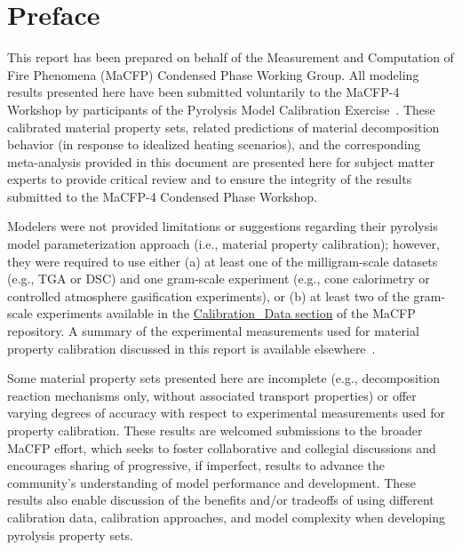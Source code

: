 \documentclass{article}
\begin{document}
	
	\newpage
	\thispagestyle{empty}
	
	\section*{Preface}
	\thispagestyle{fancy}
	This report has been prepared on behalf of the Measurement and Computation of Fire Phenomena (MaCFP) Condensed Phase Working Group. All modeling results presented here have been submitted voluntarily to the MaCFP-4 Workshop by participants of the Pyrolysis Model Calibration Exercise~\cite{MaCFP4Guidelines}. These calibrated material property sets, related predictions of material decomposition behavior (in response to idealized heating scenarios), and the corresponding meta-analysis provided in this document are presented here for subject matter experts to provide critical review and to ensure the integrity of the results submitted to the MaCFP-4 Condensed Phase Workshop. 
	
	Modelers were not provided limitations or suggestions regarding their pyrolysis model parameterization approach (i.e., material property calibration); however, they were required to use either (a) at least one of the milligram-scale datasets (e.g., TGA or DSC) and one gram-scale experiment (e.g., cone calorimetry or controlled atmosphere gasification experiments), or (b) at least two of the gram-scale experiments available in the \href{https://github.com/MaCFP/matl-db/tree/master/Wood/Calibration_Data}{Calibration\_Data section} of the MaCFP repository. A summary of the experimental measurements used for material property calibration discussed in this report is available elsewhere~\cite{MaCFP4PyrolysisExp}.

	Some material property sets presented here are incomplete (e.g., decomposition reaction mechanisms only, without associated transport properties) or offer varying degrees of accuracy with respect to experimental measurements used for property calibration. These results are welcomed submissions to the broader MaCFP effort, which seeks to foster collaborative and collegial discussions and encourages sharing of progressive, if imperfect, results to advance the community’s understanding of model performance and development. These results also enable discussion of the benefits and/or tradeoffs of using different calibration data, calibration approaches, and model complexity when developing pyrolysis property sets.
	
\end{document}
